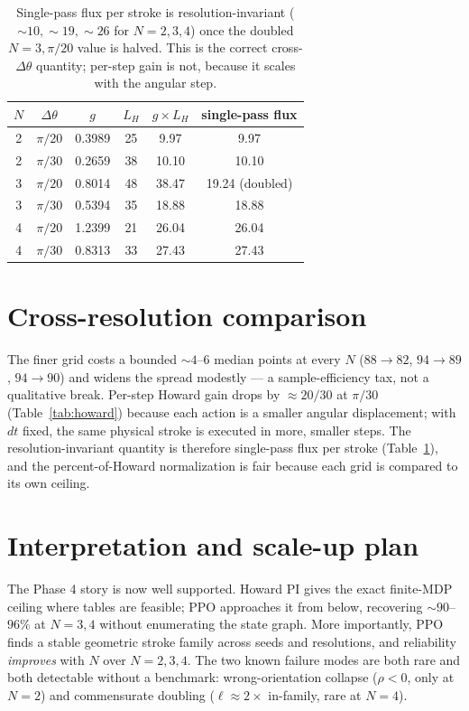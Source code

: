 \documentclass[11pt]{article}
\begin{document}
\begin{table}[htbp]
\centering
\begin{tabular}{c c c c c c}
\toprule
$N$ & $\Delta\theta$ & $g$ & $L_H$ & $g\times L_H$ & single-pass flux \\
\midrule
2 & $\pi/20$ & 0.3989 & 25 & 9.97 & 9.97 \\
2 & $\pi/30$ & 0.2659 & 38 & 10.10 & 10.10 \\
3 & $\pi/20$ & 0.8014 & 48 & 38.47 & 19.24 (doubled) \\
3 & $\pi/30$ & 0.5394 & 35 & 18.88 & 18.88 \\
4 & $\pi/20$ & 1.2399 & 21 & 26.04 & 26.04 \\
4 & $\pi/30$ & 0.8313 & 33 & 27.43 & 27.43 \\
\bottomrule
\end{tabular}
\caption{Single-pass flux per stroke is resolution-invariant
($\sim10,\sim19,\sim26$ for $N=2,3,4$) once the doubled $N=3,\pi/20$ value is
halved. This is the correct cross-$\Delta\theta$ quantity; per-step gain is not,
because it scales with the angular step.}
\label{tab:flux}
\end{table}

\section{Cross-resolution comparison}
\label{sec:resolution}

The finer grid costs a bounded $\sim4$--$6$ median points at every $N$
($88\to82$, $94\to89$, $94\to90$) and widens the spread modestly --- a
sample-efficiency tax, not a qualitative break. Per-step Howard gain drops by
$\approx 20/30$ at $\pi/30$ (Table~\ref{tab:howard}) because each action is a
smaller angular displacement; with $dt$ fixed, the same physical stroke is
executed in more, smaller steps. The resolution-invariant quantity is therefore
single-pass flux per stroke (Table~\ref{tab:flux}), and the percent-of-Howard
normalization is fair because each grid is compared to its own ceiling.

\section{Interpretation and scale-up plan}

The Phase 4 story is now well supported. Howard PI gives the exact finite-MDP
ceiling where tables are feasible; PPO approaches it from below, recovering
$\sim90$--$96\%$ at $N=3,4$ without enumerating the state graph. More
importantly, PPO finds a stable geometric stroke family across seeds and
resolutions, and reliability \emph{improves} with $N$ over $N=2,3,4$. The two
known failure modes are both rare and both detectable without a benchmark:
wrong-orientation collapse ($\rho<0$, only at $N=2$) and commensurate doubling
($\ell\approx2\times$ in-family, rare at $N=4$).
\end{document}
